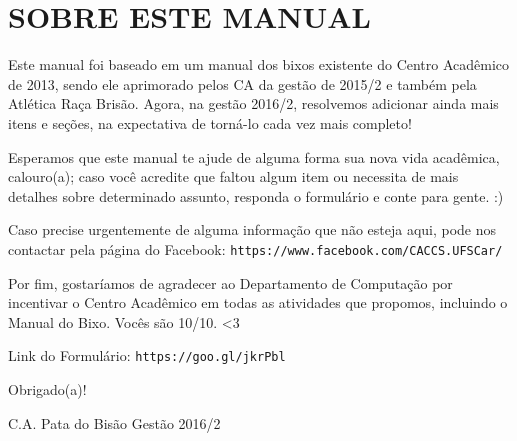 \section{SOBRE ESTE MANUAL}
Este manual foi baseado em um manual dos bixos existente do Centro Acadêmico de 2013, sendo ele aprimorado pelos CA da gestão de 2015/2 e também pela Atlética Raça Brisão. Agora, na gestão 2016/2, resolvemos adicionar ainda mais itens e seções, na expectativa de torná-lo cada vez mais completo!

Esperamos que este manual te ajude de alguma forma sua nova vida acadêmica, calouro(a); caso você acredite que faltou algum item ou necessita de mais detalhes sobre determinado assunto, responda o formulário e conte para gente. :)

Caso precise urgentemente de alguma informação que não esteja aqui, pode nos contactar pela página do Facebook: \texttt{https://www.facebook.com/CACCS.UFSCar/}

Por fim, gostaríamos de agradecer ao Departamento de Computação por incentivar o Centro Acadêmico em todas as atividades que propomos, incluindo o Manual do Bixo. Vocês são 10/10. <3

Link do Formulário: \texttt{https://goo.gl/jkrPbl}

\begin{flushright}
  Obrigado(a)!

  C.A. Pata do Bisão Gestão 2016/2
\end{flushright}
